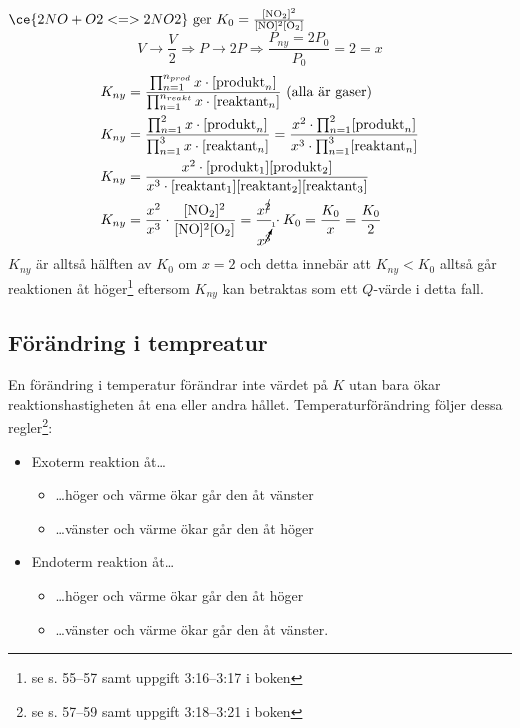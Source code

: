 \begin{exm}
    $\ce{2NO + O2 <=> 2NO2} \mathrm{\ ger \ } K_0=\frac{\mathrm{[NO_2]^2}}{\mathrm{[NO]^2[O_2]}}$
    \begin{equation*}
        V \rightarrow \frac{V}{2} \Rightarrow P \rightarrow 2P \Rightarrow \frac{P_{ny}=2P_0}{P_0} = 2 = x
    \end{equation*}
    \begin{align*}
        K_{ny} &= \frac{\prod^{n_{prod}}_{n=1} x \cdot [\mathrm{produkt}_n]}{\prod^{n_{reakt}}_{n=1} x \cdot [\mathrm{reaktant}_n]} \text{ (alla är gaser)} \\
        K_{ny} &= \frac{\prod^{2}_{n=1} x \cdot [\mathrm{produkt}_n]}{\prod^{3}_{n=1} x \cdot [\mathrm{reaktant}_n]} = \frac{x^2 \cdot \prod^{2}_{n=1} [\mathrm{produkt}_n]}{x^3 \cdot \prod^{3}_{n=1} [\mathrm{reaktant}_n]} \\
        K_{ny} &= \frac{x^2 \cdot \mathrm{[produkt_1][produkt_2]}}{x^3 \cdot \mathrm{[reaktant_1][reaktant_2][reaktant_3]}} \\
        K_{ny} &= \frac{x^2}{x^3} \cdot \frac{\mathrm{[NO_2]^2}}{\mathrm{[NO]^2[O_2]}} = \frac{x^{\cancel{2}}}{x^{\cancelto{1}{3}}} \cdot K_0 = \frac{K_0}{x} = \frac{K_0}{2}
    \end{align*}
    $K_{ny}$ är alltså hälften av $K_0$ om $x=2$ och detta innebär att $K_{ny} < K_0$ alltså går reaktionen åt höger\footnote{se s. 55--57 samt uppgift 3:16--3:17 i boken} eftersom $K_{ny}$ kan betraktas som ett $Q$-värde i detta fall.
\end{exm}

\subsection{Förändring i tempreatur}
En förändring i temperatur förändrar inte värdet på $K$ utan bara ökar reaktionshastigheten åt ena eller andra hållet. Temperaturförändring följer dessa regler\footnote{se s. 57--59 samt uppgift 3:18--3:21 i boken}:
\begin{itemize}
    \item Exoterm reaktion åt\ldots
    \begin{itemize}
        \item \ldots höger och värme ökar går den åt vänster
        \item \ldots vänster och värme ökar går den åt höger
    \end{itemize}
    \item Endoterm reaktion åt\ldots
    \begin{itemize}
        \item \ldots höger och värme ökar går den åt höger
        \item \dots vänster och värme ökar går den åt vänster.
    \end{itemize}
\end{itemize}


